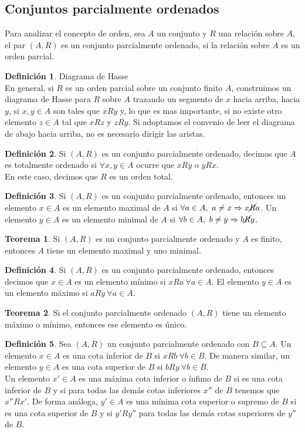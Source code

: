 \documentclass[10pt]{article}
\theoremstyle{definition}
\newtheorem{definition}{Definición}[section]
\newtheorem{theorem}{Teorema}[section]
\begin{document}
    \subsection{Conjuntos parcialmente ordenados}
    Para analizar el concepto de orden, sea $A$ un conjunto y $R$ una relación sobre $A$, el par $(A,R)$ es un conjunto parcialmente ordenado, si la relación sobre $A$ es un orden parcial.
    \begin{definition}{Diagrama de Hasse}
        \\En general, si $R$ es un orden parcial sobre un conjunto finito $A$, construimos un diagrama de Hasse para $R$ sobre $A$ trazando un segmento de $x$ hacia arriba, hacia $y$, si $x,y\in A$ son tales que $xRy$ y, lo que es mas importante, si no existe otro elemento $z\in A$ tal que $xRz$ y $zRy$. Si adoptamos el convenio de leer el diagrama de abajo hacia arriba, no es necesario dirigir las aristas.
    \end{definition}
    \begin{definition}
        Si $(A,R)$ es un conjunto parcialmente ordenado, decimos que $A$ es totalmente ordenado si $\forall x,y\in A$ ocurre que $xRy$ o $yRx$.\\
        En este caso, decimos que $R$ es un orden total.
    \end{definition}
    \begin{definition}
        Si $(A,R)$ es un conjunto parcialmente ordenado, entonces un elemento $x\in A$ es un elemento maximal de $A$ si $\forall a\in A,\ a\neq x\Rightarrow x\cancel{R}a$. Un elemento $y\in A$ es un elemento minimal de $A$ si $\forall b\in A,\ b\neq y\Rightarrow b\cancel{R}y$.
    \end{definition}
    \begin{theorem}
        Si $(A,R)$ es un conjunto parcialmente ordenado y $A$ es finito, entonces $A$ tiene un elemento maximal y uno minimal.
    \end{theorem}
    \begin{definition}
        Si $(A,R)$ es un conjunto parcialmente ordenado, entonces decimos que $x\in A$ es un elemento mínimo si $xRa\ \forall a\in A$. El elemento $y\in A$ es un elemento máximo si $aRy\ \forall a\in A$.
    \end{definition}
    \begin{theorem}
        Si el conjunto parcialmente ordenado $(A,R)$ tiene un elemento máximo o mínimo, entonces ese elemento es único.
    \end{theorem}
    \begin{definition}
        Sea $(A,R)$ un conjunto parcialmente ordenado con $B\subseteq A$. Un elemento $x\in A$ es una cota inferior de $B$ si $xRb\ \forall b\in B$. De manera similar, un elemento $y\in A$ es una cota superior de $B$ si $bRy\ \forall b\in B$.\\
        Un elemento $x'\in A$ es una máxima cota inferior o ínfimo de $B$ si es una cota inferior de $B$ y si para todas las demás cotas inferiores $x''$ de $B$ tenemos que $x''Rx'$. De forma análoga, $y'\in A$ es una mínima cota superior o supremo de $B$ si es una cota superior de $B$ y si $y'Ry''$ para todas las demás cotas superiores de $y''$ de $B$.
    \end{definition}
\end{document}
